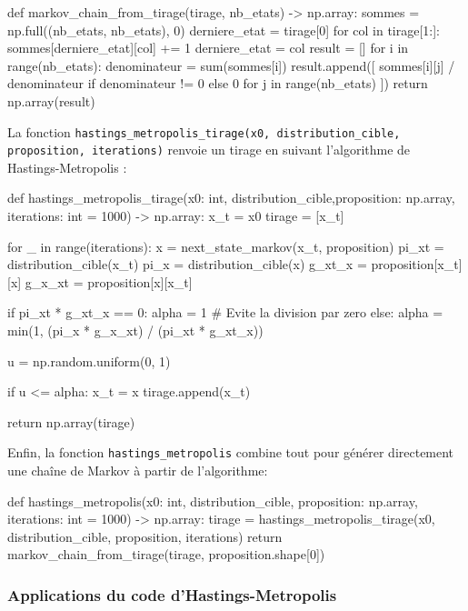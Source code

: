\documentclass{article}
\begin{document}
\begin{python}
def markov_chain_from_tirage(tirage, nb_etats) -> np.array:
    sommes = np.full((nb_etats, nb_etats), 0)
    derniere_etat = tirage[0]
    for col in tirage[1:]:
        sommes[derniere_etat][col] += 1
        derniere_etat = col
    result = []
    for i in range(nb_etats):
        denominateur = sum(sommes[i])
        result.append([
            sommes[i][j] / denominateur if denominateur != 0 else 0 
            for j in range(nb_etats)
        ])
    return np.array(result)
\end{python}

\newpage %
La fonction \texttt{hastings\_metropolis\_tirage(x0, distribution\_cible, proposition, iterations)} 
renvoie un tirage en suivant l'algorithme de Hastings-Metropolis :

\begin{python}
def hastings_metropolis_tirage(x0: int, distribution_cible,proposition: np.array, iterations: int = 1000) -> np.array:
    x_t = x0
    tirage = [x_t]

    for _ in range(iterations):
        x = next_state_markov(x_t, proposition)
        pi_xt = distribution_cible(x_t)
        pi_x = distribution_cible(x)
        g_xt_x = proposition[x_t][x]
        g_x_xt = proposition[x][x_t]

        if pi_xt * g_xt_x == 0:
            alpha = 1 # Evite la division par zero
        else:
            alpha = min(1, (pi_x * g_x_xt) / (pi_xt * g_xt_x))

        u = np.random.uniform(0, 1)

        if u <= alpha:
            x_t = x
        tirage.append(x_t)

    return np.array(tirage)
\end{python}

Enfin, la fonction \texttt{hastings\_metropolis} combine tout pour générer directement une chaîne de Markov à partir de l'algorithme:

\begin{python}
def hastings_metropolis(x0: int, distribution_cible, 
                       proposition: np.array, iterations: int = 1000) -> np.array:
    tirage = hastings_metropolis_tirage(x0, distribution_cible, proposition, iterations)
    return markov_chain_from_tirage(tirage, proposition.shape[0])
\end{python}

\newpage
\subsubsection{Applications du code d'Hastings-Metropolis}
\end{document}
